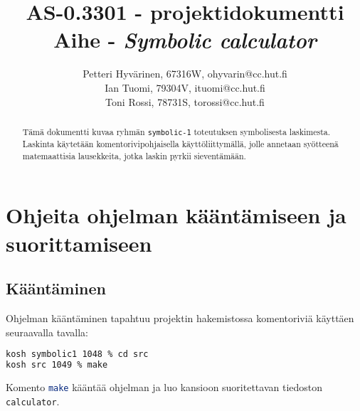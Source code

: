 \documentclass[10pt,a4paper]{article}
\author{Petteri Hyvärinen, 67316W, ohyvarin@cc.hut.fi\\Ian Tuomi, 79304V, ituomi@cc.hut.fi\\Toni Rossi, 78731S, torossi@cc.hut.fi}
\title{AS-0.3301 - projektidokumentti \\ \textbf{Aihe - \textit{Symbolic calculator}}}
\begin{document}

\maketitle

\begin{abstract}
Tämä dokumentti kuvaa ryhmän \texttt{symbolic-1} toteutuksen symbolisesta laskimesta.
Laskinta käytetään komentorivipohjaisella käyttöliittymällä, jolle annetaan syötteenä
matemaattisia lausekkeita, jotka laskin pyrkii sieventämään.
\end{abstract}

\section{Ohjeita ohjelman kääntämiseen ja suorittamiseen}

\subsection{Kääntäminen}
Ohjelman kääntäminen tapahtuu projektin hakemistossa komentoriviä käyttäen seuraavalla tavalla:

\begin{lstlisting}[language=bash]
kosh symbolic1 1048 % cd src
kosh src 1049 % make
\end{lstlisting}
Komento \lstinline[language=bash]!make! kääntää ohjelman ja luo kansioon suoritettavan tiedoston
\texttt{calculator}.
\end{document}
